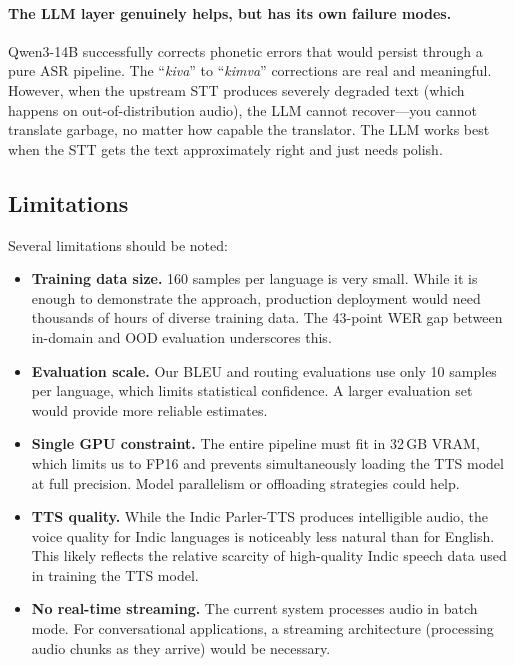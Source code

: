 \paragraph{The LLM layer genuinely helps, but has its own failure modes.} Qwen3-14B successfully corrects phonetic errors that would persist through a pure ASR pipeline. The ``\textit{kiva}'' to ``\textit{kimva}'' corrections are real and meaningful. However, when the upstream STT produces severely degraded text (which happens on out-of-distribution audio), the LLM cannot recover---you cannot translate garbage, no matter how capable the translator. The LLM works best when the STT gets the text approximately right and just needs polish.

\subsection{Limitations}

Several limitations should be noted:

\begin{itemize}[leftmargin=*]
    \item \textbf{Training data size.} 160 samples per language is very small. While it is enough to demonstrate the approach, production deployment would need thousands of hours of diverse training data. The 43-point WER gap between in-domain and OOD evaluation underscores this.

    \item \textbf{Evaluation scale.} Our BLEU and routing evaluations use only 10 samples per language, which limits statistical confidence. A larger evaluation set would provide more reliable estimates.

    \item \textbf{Single GPU constraint.} The entire pipeline must fit in 32\,GB VRAM, which limits us to FP16 and prevents simultaneously loading the TTS model at full precision. Model parallelism or offloading strategies could help.

    \item \textbf{TTS quality.} While the Indic Parler-TTS produces intelligible audio, the voice quality for Indic languages is noticeably less natural than for English. This likely reflects the relative scarcity of high-quality Indic speech data used in training the TTS model.

    \item \textbf{No real-time streaming.} The current system processes audio in batch mode. For conversational applications, a streaming architecture (processing audio chunks as they arrive) would be necessary.
\end{itemize}

